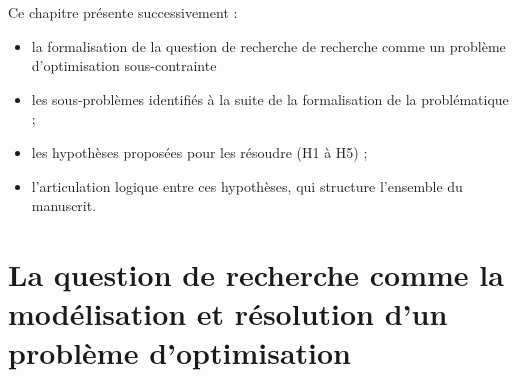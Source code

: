 \documentclass[ twoside,openright,titlepage,numbers=noenddot,headinclude,%
                footinclude=true,cleardoublepage=empty,abstractoff, %
                BCOR=5mm,paper=a4,fontsize=11pt,%
                french,american,%
                ]{scrreprt}
\begin{document}
Ce chapitre présente successivement :
\begin{itemize}
    \item la formalisation de la question de recherche de recherche comme un problème d'optimisation sous-contrainte
    \item les sous-problèmes identifiés à la suite de la formalisation de la problématique ;
    \item les hypothèses proposées pour les résoudre (H1 à H5) ;
    \item l'articulation logique entre ces hypothèses, qui structure l'ensemble du manuscrit.
\end{itemize}

\section{La question de recherche comme la modélisation et résolution d'un problème d'optimisation}

\end{document}
